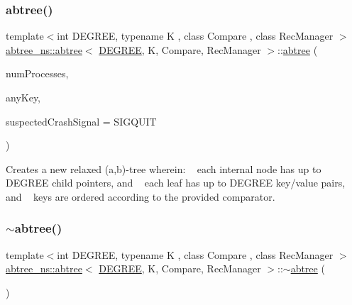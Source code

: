 \mbox{\label{classabtree__ns_1_1abtree_a1b7319a8a3f68d6106c2e011713201a7}} 
\subsubsection{\texorpdfstring{abtree()}{abtree()}\hspace{0.1cm}{\footnotesize\ttfamily [2/2]}}
{\footnotesize\ttfamily template$<$int D\+E\+G\+R\+EE, typename K , class Compare , class Rec\+Manager $>$ \\
\hyperlink{classabtree__ns_1_1abtree}{abtree\+\_\+ns\+::abtree}$<$ \hyperlink{brown__sigouin__abtree__kcas_2adapter_8h_a5d88b17d70c985f2f2b8e987037fd6dd}{D\+E\+G\+R\+EE}, K, Compare, Rec\+Manager $>$\+::\hyperlink{classabtree__ns_1_1abtree}{abtree} (\begin{DoxyParamCaption}\item[{const int}]{num\+Processes,  }\item[{const K}]{any\+Key,  }\item[{int}]{suspected\+Crash\+Signal = {\ttfamily SIGQUIT} }\end{DoxyParamCaption})\hspace{0.3cm}{\ttfamily [inline]}}

Creates a new relaxed (a,b)-\/tree wherein\+: ~\newline
 each internal node has up to {\ttfamily D\+E\+G\+R\+EE} child pointers, and ~\newline
 each leaf has up to {\ttfamily D\+E\+G\+R\+EE} key/value pairs, and ~\newline
 keys are ordered according to the provided comparator. \mbox{\label{classabtree__ns_1_1abtree_a083203a9c7d98c33b08b034a83f40e0e}} 
\subsubsection{\texorpdfstring{$\sim$abtree()}{~abtree()}\hspace{0.1cm}{\footnotesize\ttfamily [2/2]}}
{\footnotesize\ttfamily template$<$int D\+E\+G\+R\+EE, typename K , class Compare , class Rec\+Manager $>$ \\
\hyperlink{classabtree__ns_1_1abtree}{abtree\+\_\+ns\+::abtree}$<$ \hyperlink{brown__sigouin__abtree__kcas_2adapter_8h_a5d88b17d70c985f2f2b8e987037fd6dd}{D\+E\+G\+R\+EE}, K, Compare, Rec\+Manager $>$\+::$\sim$\hyperlink{classabtree__ns_1_1abtree}{abtree} (\begin{DoxyParamCaption}{ }\end{DoxyParamCaption})\hspace{0.3cm}{\ttfamily [inline]}}



